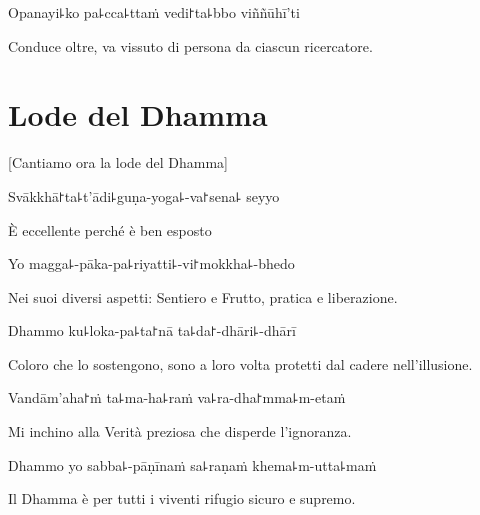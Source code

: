 Opanayi꜕ko pa꜕cca꜕ttaṁ vedi꜓ta꜕bbo viññūhī'ti
\begin{english}
Conduce oltre, va vissuto di persona da ciascun ricercatore.\\
\end{english}

\chapter*{Lode del Dhamma}

\begin{leader}
\end{leader}

\begin{english}
[Cantiamo ora la lode del Dhamma]
\end{english}


Svākkhā꜓ta꜕t'ādi꜕guṇa-yoga꜕-va꜓sena꜕ seyyo\\

\begin{english}
È eccellente perché è ben esposto \\
\end{english}

Yo magga꜕-pāka-pa꜕riyatti꜕-vi꜓mokkha꜕-bhedo\\

\begin{english}
Nei suoi diversi aspetti: Sentiero e Frutto, pratica e liberazione.\\
\end{english}

Dhammo ku꜕loka-pa꜕ta꜓nā ta꜕da꜓-dhāri꜕-dhārī\\

\begin{english}
Coloro che lo sostengono, sono a loro volta protetti dal cadere nell'illusione.\\
\end{english}

Vandām'aha꜓ṁ ta꜕ma-ha꜕raṁ va꜕ra-dha꜓mma꜕m-etaṁ\\

\begin{english}
Mi inchino alla Verità preziosa che disperde l'ignoranza.\\
\end{english}

Dhammo yo sabba꜕-pāṇīnaṁ sa꜕raṇaṁ khema꜕m-utta꜕maṁ\\

\begin{english}
Il Dhamma è per tutti i viventi rifugio sicuro e supremo.\\
\end{english}


